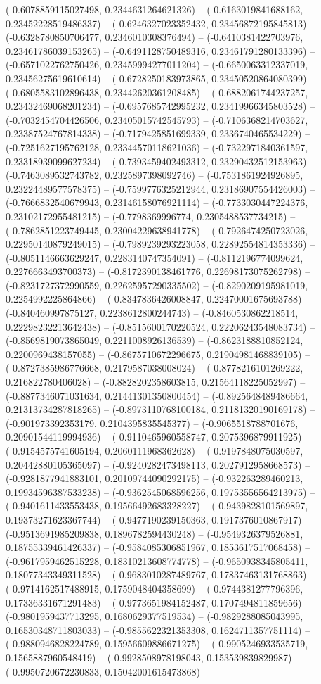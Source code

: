 (-0.6078859115027498, 0.2344631264621326) -- (-0.6163019841688162, 0.23452228519486337) -- (-0.6246327023352432, 0.23456872195845813) -- (-0.6328780850706477, 0.2346010308376494) -- (-0.6410381422703976, 0.23461786039153265) -- (-0.6491128750489316, 0.23461791280133396) -- (-0.6571022762750426, 0.23459994277011204) -- (-0.6650063312337019, 0.23456275619610614) -- (-0.6728250183973865, 0.23450520864080399) -- (-0.6805583102896438, 0.23442620361208485) -- (-0.6882061744237257, 0.23432469068201234) -- (-0.6957685742995232, 0.23419966345803528) -- (-0.7032454704426506, 0.23405015742545793) -- (-0.7106368214703627, 0.23387524767814338) -- (-0.7179425851699339, 0.2336740465534229) -- (-0.7251627195762128, 0.23344570118621036) -- (-0.7322971840361597, 0.23318939099627234) -- (-0.7393459402493312, 0.23290432512153963) -- (-0.7463089532743782, 0.2325897398092746) -- (-0.7531861924926895, 0.23224489577578375) -- (-0.7599776325212944, 0.23186907554426003) -- (-0.7666832540679943, 0.23146158076921114) -- (-0.7733030447224376, 0.23102172955481215) -- (-0.7798369996774, 0.2305488537734215) -- (-0.7862851223749445, 0.23004229638941778) -- (-0.7926474250723026, 0.22950140879249015) -- (-0.7989239293223058, 0.22892554814353336) -- (-0.8051146663629247, 0.2283140747354091) -- (-0.8112196774099624, 0.2276663493700373) -- (-0.8172390138461776, 0.22698173075262798) -- (-0.8231727372990559, 0.22625957290335502) -- (-0.8290209195981019, 0.2254992225864866) -- (-0.8347836426008847, 0.22470001675693788) -- (-0.840460997875127, 0.2238612800244743) -- (-0.8460530862218514, 0.22298232213642438) -- (-0.8515600170220524, 0.22206243548083734) -- (-0.8569819073865049, 0.2211008926136539) -- (-0.8623188810852124, 0.2200969438157055) -- (-0.8675710672296675, 0.21904981468839105) -- (-0.8727385986776668, 0.2179587038008024) -- (-0.8778216101269222, 0.216822780406028) -- (-0.8828202358603815, 0.21564118225052997) -- (-0.8877346071031634, 0.21441301350800454) -- (-0.8925648489486664, 0.21313734287818265) -- (-0.8973110768100184, 0.21181320190169178) -- (-0.901973392353179, 0.2104395835545377) -- (-0.9065518788701676, 0.20901544119994936) -- (-0.9110465960558747, 0.2075396879911925) -- (-0.9154575741605194, 0.2060111968362628) -- (-0.9197848075030597, 0.20442880105365097) -- (-0.9240282473498113, 0.2027912958668573) -- (-0.9281877941883101, 0.20109744090292175) -- (-0.932263289460213, 0.19934596387533238) -- (-0.9362545068596256, 0.19753556564213975) -- (-0.9401611433553438, 0.19566492683328227) -- (-0.9439828101569897, 0.19373271623367744) -- (-0.9477190239150363, 0.1917376010867917) -- (-0.9513691985209838, 0.1896782594430248) -- (-0.9549326379526881, 0.18755339461426337) -- (-0.9584085306851967, 0.1853617517068458) -- (-0.9617959462515228, 0.18310213608774778) -- (-0.9650938345805411, 0.18077343349311528) -- (-0.9683010287489767, 0.17837463131768863) -- (-0.9714162517488915, 0.1759048404358699) -- (-0.9744381277796396, 0.17336331671291483) -- (-0.9773651984152487, 0.1707494811859656) -- (-0.9801959437713295, 0.1680629377519534) -- (-0.9829288085043995, 0.16530348711803033) -- (-0.9855622321353308, 0.1624711357751114) -- (-0.9880946828224789, 0.15956609886671275) -- (-0.9905246933535719, 0.1565887960548419) -- (-0.9928508978198043, 0.153539839829987) -- (-0.9950720672230833, 0.15042001615473868) -- 